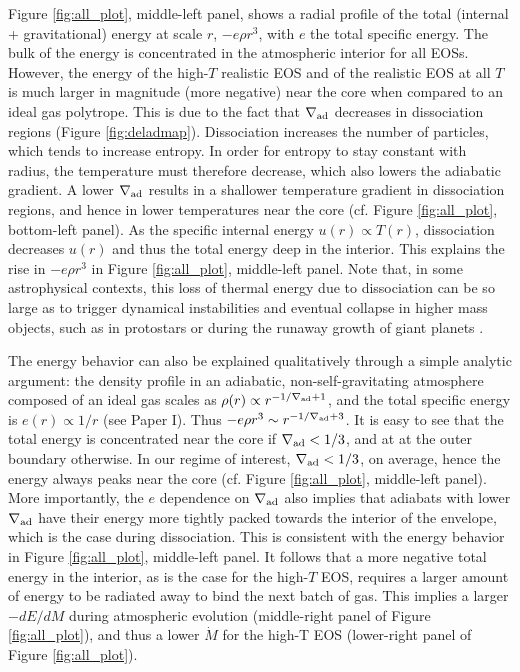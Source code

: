 \documentclass[apj]{emulateapj}
\newcommand{\delad}{\nabla_{\rm ad}}
\begin{document}
Figure \ref{fig:all_plot}, middle-left panel, shows a radial profile of the total (internal + gravitational) energy at scale $r$, $-e \rho r^3$, with $e$ the total specific energy.   %
The bulk of the energy is concentrated in the atmospheric interior for all EOSs. However, the energy of the high-$T$ realistic EOS and of the realistic EOS at all $T$ is much larger in magnitude (more negative) near the core when compared to an ideal gas polytrope. This is due to the fact that $\delad$ decreases in dissociation regions (Figure \ref{fig:deladmap}). Dissociation increases the number of particles, which tends to increase entropy. In order for entropy to stay constant with radius, the temperature must therefore decrease, which also lowers the adiabatic gradient. A lower $\delad$ results in a shallower temperature gradient in dissociation regions, and hence in lower temperatures near the core (cf. Figure \ref{fig:all_plot}, bottom-left panel). As the specific internal energy $u(r) \propto T(r)$, dissociation decreases $u(r)$ and thus the total energy deep in the interior. This explains the rise in $-e \rho r^3$ in Figure \ref{fig:all_plot}, middle-left panel.  Note that, in some astrophysical contexts, this loss of thermal energy due to dissociation can be so large as to trigger dynamical instabilities and eventual collapse in higher mass objects, such as in protostars \citep{larson69} or during the runaway growth of giant planets \citep{bodenheimer80}.  



The energy behavior can also be explained qualitatively through a simple analytic argument: the density profile in an adiabatic, non-self-gravitating atmosphere composed of an ideal gas scales as $\rho(r) \propto r^{-1/\delad+1}$, and the total specific energy is $e(r) \propto 1/r$ (see Paper I). Thus $- e \rho r^3 \sim r^{-1/\delad+3}$. It is easy to see that the total energy is concentrated near the core if $\delad<1/3$, and at at the outer boundary otherwise. In our regime of interest, $\delad<1/3$, on average, hence the energy always peaks near the core (cf. Figure \ref{fig:all_plot}, middle-left panel). More importantly, the $e$ dependence on $\delad$ also implies that adiabats with lower $\delad$ have their energy more tightly packed towards the interior of the envelope, which is the case during dissociation. This is consistent with the energy behavior in Figure \ref{fig:all_plot}, middle-left panel. It follows that a more negative total energy in the interior, as is the case for the high-$T$ EOS, requires a larger amount of energy to be radiated away to bind the next batch of gas. This implies a larger $-dE/dM$ during atmospheric evolution (middle-right panel of Figure \ref{fig:all_plot}), and thus a lower $\dot{M}$ for the high-T EOS (lower-right panel of Figure \ref{fig:all_plot}). 
\end{document}

